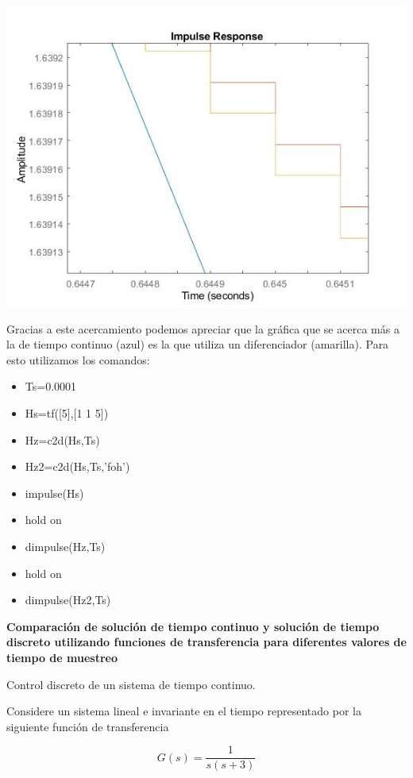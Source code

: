 \noindent \includegraphics[scale=0.6]{./img2/SalidaTs00001DosHzAcercamiento}

Gracias a este acercamiento podemos apreciar que la gráfica que se acerca más a la de tiempo continuo (azul) es la que utiliza un diferenciador (amarilla). Para esto utilizamos los comandos:

\begin{itemize}
\item Ts=0.0001
\item Hs=tf([5],[1 1 5])
\item Hz=c2d(Hs,Ts)
\item Hz2=c2d(Hs,Ts,'foh')
\item impulse(Hs)
\item hold on
\item dimpulse(Hz,Ts)
\item hold on
\item dimpulse(Hz2,Ts)
\end{itemize}

\textbf{Comparación de solución de tiempo continuo y solución de tiempo discreto utilizando funciones de transferencia para diferentes valores de tiempo de muestreo }

{\Large Control discreto de un sistema de tiempo continuo.}

Considere un sistema lineal e invariante en el tiempo representado por la siguiente función de transferencia

\begin{equation*}
	G(s)=\frac{1}{s(s+3)}
\end{equation*}

